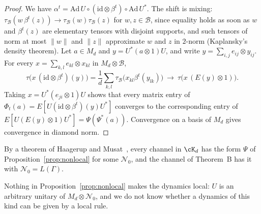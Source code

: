 \begin{proof}
We have $\alpha^t=\mathrm{Ad}\,U\circ(\mathrm{id}\otimes\beta^t)\circ\mathrm{Ad}\,U^*$. The shift is mixing: $\tau_{\mathcal B}(w\,\beta^t(z))\to\tau_{\mathcal B}(w)\tau_{\mathcal B}(z)$ for
$w,z\in\mathcal B$, since equality holds as soon as $w$ and $\beta^t(z)$ are elementary tensors with disjoint supports, and such tensors of norm
at most $\|w\|$ and $\|z\|$ approximate $w$ and $z$ in $2$-norm (Kaplansky's density theorem). Let $a\in M_d$ and $y=U^*(a\otimes1)U$, and write
$y=\sum_{i,j}e_{ij}\otimes y_{ij}$. For every $x=\sum_{k,l}e_{kl}\otimes x_{kl}$ in $M_d\otimes\mathcal B$,
\[
\tau\bigl(x\,(\mathrm{id}\otimes\beta^t)(y)\bigr)=\frac1d\sum_{k,l}\tau_{\mathcal B}\bigl(x_{kl}\beta^t(y_{lk})\bigr)\ \longrightarrow\ \tau\bigl(x\,(E(y)\otimes1)\bigr).
\]
Taking $x=U^*(e_{ji}\otimes1)U$ shows that every matrix entry of $\Phi_t(a)=E[U(\mathrm{id}\otimes\beta^t)(y)U^*]$ converges to the corresponding entry
of $E[U(E(y)\otimes1)U^*]=\Psi(\Psi^*(a))$. Convergence on a basis of $M_d$ gives convergence in diamond norm.
\end{proof}

By a theorem of Haagerup and Musat~\cite[Theorem~3.6]{HaagerupMusat2015}, every channel in $\cK_d$ has the form $\Psi$ of
Proposition~\ref{prop:nonlocal} for some $\mathcal N_0$, and the channel of Theorem~B has it with $\mathcal N_0=L(\Gamma)$.

Nothing in Proposition~\ref{prop:nonlocal} makes the dynamics local: $U$ is an arbitrary unitary of $M_d\otimes\mathcal N_0$, and we do not know
whether a dynamics of this kind can be given by a local rule.

